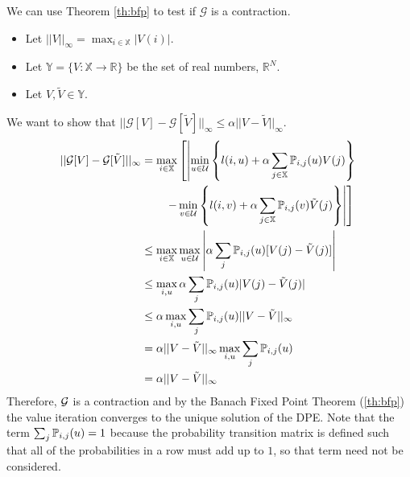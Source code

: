 We can use Theorem \ref{th:bfp} to test if $\mathcal{G}$ is a contraction.
\begin{itemize}
\item Let $||V||_\infty = \max_{i\in\mathbb{X}}|V(i)|$.
\item Let $\mathbb{Y}=\{V:\mathbb{X}\to\mathbb{R}\}$ be the set of real numbers, $\mathbb{R}^N$.
\item Let $V,\tilde{V}\in\mathbb{Y}$.
\end{itemize}
We want to show that $||\mathcal{G}[V]-\mathcal{G}[\tilde{V}]||_\infty\leq\alpha||V-\tilde{V}||_\infty$.
\begin{align*}
||\mathcal{G}[V]-\mathcal{G}[\tilde{V}]||_\infty &= \max_{i\in\mathbb{X}}\left[\left|\min_{u\in\mathcal{U}}\left\lbrace l(i,u)+\alpha\sum_{j\in\mathbb{X}}\mathbb{P}_{i,j}(u)V(j)\right\rbrace \right.\right. \\
&\left.\left.\qquad - \min_{v\in\mathcal{U}}\left\lbrace l(i,v)+\alpha\sum_{j\in\mathbb{X}}\mathbb{P}_{i,j}(v)\tilde{V}(j)\right\rbrace \right|\right] \\
&\leq \max_{i\in\mathbb{X}}\max_{u\in\mathcal{U}}\left|\alpha\sum_j\mathbb{P}_{i,j}(u)[V(j)-\tilde{V}(j)]\right| \\
&\leq \max_{i,u}\alpha\sum_j\mathbb{P}_{i,j}(u)|V(j)-\tilde{V}(j)| \\
&\leq \alpha\max_{i,u}\sum_j\mathbb{P}_{i,j}(u)||V-\tilde{V}||_\infty \\
&= \alpha||V-\tilde{V}||_\infty\max_{i,u}\sum_j\mathbb{P}_{i,j}(u) \\
&= \alpha||V-\tilde{V}||_\infty
\end{align*}
Therefore, $\mathcal{G}$ is a contraction and by the Banach Fixed Point Theorem (\ref{th:bfp}) the value iteration converges to the unique solution of the DPE. Note that the term $\sum_j\mathbb{P}_{i,j}(u)=1$ because the probability transition matrix is defined such that all of the probabilities in a row must add up to $1$, so that term need not be considered.


